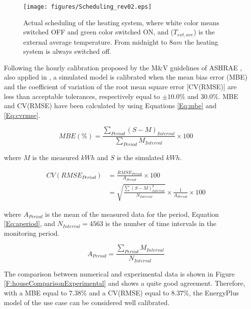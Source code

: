 \begin{figure}[h!]
	\begin{center}
		\texttt{[image: figures/Scheduling\_rev02.eps]}
		\caption{Actual scheduling of the heating system, where white color means switched OFF and green color switched ON, and ($T_{ext,ave}$) is the external average temperature. From midnight to $8am$ the heating system is always switched off.}
		\captionsetup{justification=centering}
		\label{F:houseActualScheduling}
	\end{center}
\end{figure}
Following the hourly calibration proposed by the M\&V guidelines of ASHRAE \cite{USDOE}, also applied in \cite{Mustafarai2014,Raftery2011}, a simulated model is calibrated when the mean bias error (MBE) and the coefficient of variation of the root mean square error [CV(RMSE)] are less than acceptable tolerances, respectively equal to $\pm 10.0\%$ and $30.0\%$. MBE and CV(RMSE) have been calculated by using Equations \eqref{Eq:mbe} and \eqref{Eq:cvrmse}.

\begin{equation}\label{Eq:mbe}
MBE(\%) = \frac{\sum_{Period}{(S-M)_{Interval}}}{\sum_{Period}{M_{Interval}}} \times 100
\end{equation}

where $M$ is the measured $kWh$ and $S$ is the simulated $kWh$.

\begin{align}\label{Eq:cvrmse}
\nonumber CV(RMSE_{Period}) &= \frac{RMSE_{Period}}{A_{Period}} \times 100 \\
				            &= \sqrt{\frac{\sum{(S-M)^2_{Interval}}}{N_{Interval}}} \times \frac 1{A_{Period}} \times 100
\end{align}

where $A_{Period}$ is the mean of the measured data for the period, Equation \eqref{Eq:aperiod}, and $N_{Interval} = 4563$ is the number of time intervals in the monitoring period.

\begin{equation}\label{Eq:aperiod}
A_{Period} = \frac{\sum_{Period}{M_{Interval}}}{N_{Interval}}
\end{equation}

The comparison between numerical and experimental data is shown in Figure \ref{F:houseComparisonExperimental} and shows a quite good agreement. Therefore, with a MBE equal to $7.38\%$ and a CV(RMSE) equal to $8.37\%$, the EnergyPlus model of the use case can be considered well calibrated.  

